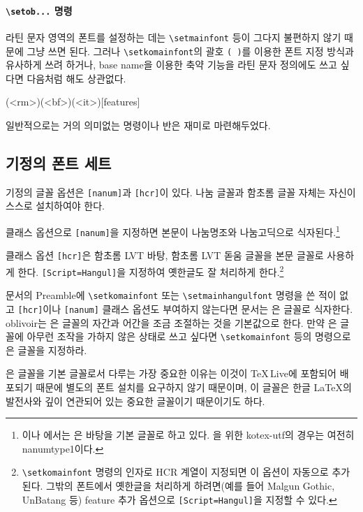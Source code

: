 \documentclass[
	12pt,
	a4paper,
	kosection,
	footnote,
	microtype,
	figtabcapt,
]{oblivoir}
\def\cs#1{\texttt{\textbackslash #1}}
\def\ct#1{\texttt{#1}}
\begin{document}
\paragraph{\cs{setob...} 명령}

라틴 문자 영역의 폰트를 설정하는 데는 \cs{setmainfont} 등이 그다지 불편하지 않기 때문에
그냥 쓰면 된다. 그러나 \cs{setkomainfont}의 괄호 \ct{( )}를 이용한 폰트 지정 방식과
유사하게 쓰려 하거나, base name을 이용한 축약 기능을 라틴 문자 정의에도 쓰고 싶다면 다음처럼 해도 상관없다.
\begin{boxedverbatim}
(<rm>)(<bf>)(<it>)[features]
\end{boxedverbatim}
일반적으로는 거의 의미없는 명령이나 반은 재미로 마련해두었다.

\subsection{기정의 폰트 세트}

기정의 글꼴 옵션은 \texttt{[nanum]}과 \texttt{[hcr]}이 있다. 나눔 글꼴과 함초롬 글꼴
자체는 자신이 스스로 설치하여야 한다.

클래스 옵션으로 \texttt{[nanum]}을 지정하면 본문이 나눔명조와 나눔고딕으로 식자된다.\footnote{%
\XeTeX 이나 \LuaTeX 에서는 은 바탕을 기본 글꼴로 하고 있다. 을 위한
kotex-utf의 경우는 여전히 nanumtype1이다.}

클래스 옵션 \texttt{[hcr]}은 함초롬 LVT 바탕, 함초롬 LVT 돋움 글꼴을 본문 글꼴로 사용하게 한다.
\texttt{[Script=Hangul]}을 지정하여 옛한글도 잘 처리하게 한다.\footnote{%
	\cs{setkomainfont} 명령의 인자로 HCR 계열이 지정되면 이 옵션이 자동으로 추가된다.
	그밖의 폰트에서 옛한글을 처리하게 하려면(예를 들어 Malgun Gothic, UnBatang 등)
	feature 추가 옵션으로 \texttt{[Script=Hangul]}을 지정할 수 있다.}

문서의 Preamble에 \verb|\setkomainfont| 또는 \verb|\setmainhangulfont| 명령을 쓴 적이 없고 \texttt{[hcr]}이나 \texttt{[nanum]} 클래스 옵션도 부여하지 않는다면 문서는 은 글꼴로 식자한다. oblivoir는
은 글꼴의 자간과 어간을 조금 조절하는 것을 기본값으로 한다. 만약 은 글꼴에 아무런 
조작을 가하지 않은 상태로 쓰고 싶다면 \verb|\setkomainfont| 등의 명령으로 은 글꼴을
지정하라.

은 글꼴을 기본 글꼴로서 다루는 가장 중요한 이유는 이것이 \TeX\,Live에 포함되어 배포되기
때문에 별도의 폰트 설치를 요구하지 않기 때문이며, 이 글꼴은 한글 \LaTeX 의 발전사와
깊이 연관되어 있는 중요한 글꼴이기 때문이기도 하다.
\end{document}
